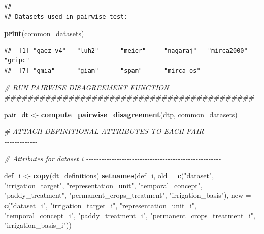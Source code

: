\documentclass[
  11pt,
]{article}
\newenvironment{Shaded}{\begin{snugshade}}{\end{snugshade}}
\newcommand{\AttributeTok}[1]{\textcolor[rgb]{0.13,0.29,0.53}{#1}}
\newcommand{\CommentTok}[1]{\textcolor[rgb]{0.56,0.35,0.01}{\textit{#1}}}
\newcommand{\FunctionTok}[1]{\textcolor[rgb]{0.13,0.29,0.53}{\textbf{#1}}}
\newcommand{\NormalTok}[1]{#1}
\newcommand{\OtherTok}[1]{\textcolor[rgb]{0.56,0.35,0.01}{#1}}
\newcommand{\StringTok}[1]{\textcolor[rgb]{0.31,0.60,0.02}{#1}}
\begin{document}
\begin{verbatim}
## 
## Datasets used in pairwise test:
\end{verbatim}

\begin{Shaded}
\begin{Highlighting}[]
\FunctionTok{print}\NormalTok{(common\_datasets)}
\end{Highlighting}
\end{Shaded}

\begin{verbatim}
##  [1] "gaez_v4"   "luh2"      "meier"     "nagaraj"   "mirca2000" "gripc"    
##  [7] "gmia"      "giam"      "spam"      "mirca_os"
\end{verbatim}

\begin{Shaded}
\begin{Highlighting}[]
\CommentTok{\# RUN PAIRWISE DISAGREEMENT FUNCTION \#\#\#\#\#\#\#\#\#\#\#\#\#\#\#\#\#\#\#\#\#\#\#\#\#\#\#\#\#\#\#\#\#\#\#\#\#\#\#\#\#\#\#}

\NormalTok{pair\_dt }\OtherTok{\textless{}{-}} \FunctionTok{compute\_pairwise\_disagreement}\NormalTok{(dtp, common\_datasets)}

\CommentTok{\# ATTACH DEFINITIONAL ATTRIBUTES TO EACH PAIR {-}{-}{-}{-}{-}{-}{-}{-}{-}{-}{-}{-}{-}{-}{-}{-}{-}{-}{-}{-}{-}{-}{-}{-}{-}{-}{-}{-}{-}{-}{-}{-}{-}{-}}

\CommentTok{\# Attributes for dataset i {-}{-}{-}{-}{-}{-}{-}{-}{-}{-}{-}{-}{-}{-}{-}{-}{-}{-}{-}{-}{-}{-}{-}{-}{-}{-}{-}{-}{-}{-}{-}{-}{-}{-}{-}{-}{-}{-}{-}{-}{-}{-}{-}{-}{-}{-}{-}{-}{-}{-}{-}{-}{-}}

\NormalTok{def\_i }\OtherTok{\textless{}{-}} \FunctionTok{copy}\NormalTok{(dt\_definitions)}
\FunctionTok{setnames}\NormalTok{(def\_i,}
         \AttributeTok{old =} \FunctionTok{c}\NormalTok{(}\StringTok{"dataset"}\NormalTok{, }\StringTok{"irrigation\_target"}\NormalTok{, }\StringTok{"representation\_unit"}\NormalTok{,}
                 \StringTok{"temporal\_concept"}\NormalTok{, }\StringTok{"paddy\_treatment"}\NormalTok{,}
                 \StringTok{"permanent\_crops\_treatment"}\NormalTok{, }\StringTok{"irrigation\_basis"}\NormalTok{),}
         \AttributeTok{new =} \FunctionTok{c}\NormalTok{(}\StringTok{"dataset\_i"}\NormalTok{, }\StringTok{"irrigation\_target\_i"}\NormalTok{, }\StringTok{"representation\_unit\_i"}\NormalTok{,}
                 \StringTok{"temporal\_concept\_i"}\NormalTok{, }\StringTok{"paddy\_treatment\_i"}\NormalTok{,}
                 \StringTok{"permanent\_crops\_treatment\_i"}\NormalTok{, }\StringTok{"irrigation\_basis\_i"}\NormalTok{))}


\end{Highlighting}
\end{Shaded}
\end{document}
